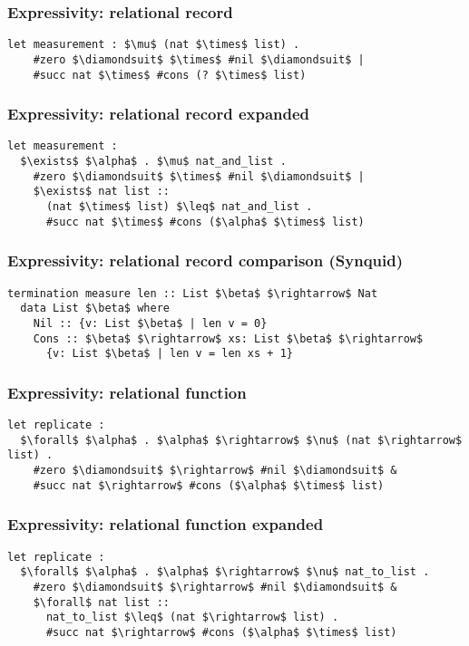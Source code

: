 \documentclass{beamer}
\begin{document}
\begin{frame}[fragile]
  \frametitle{Expressivity: relational record}

  \begin{lstlisting}[]
  let measurement : $\mu$ (nat $\times$ list) .
    #zero $\diamondsuit$ $\times$ #nil $\diamondsuit$ | 
    #succ nat $\times$ #cons (? $\times$ list)
  \end{lstlisting} 

\end{frame}

\begin{frame}[fragile]
  \frametitle{Expressivity: relational record expanded}

  \begin{lstlisting}[]
  let measurement : 
  $\exists$ $\alpha$ . $\mu$ nat_and_list .
    #zero $\diamondsuit$ $\times$ #nil $\diamondsuit$ | 
    $\exists$ nat list :: 
      (nat $\times$ list) $\leq$ nat_and_list .
      #succ nat $\times$ #cons ($\alpha$ $\times$ list)
  \end{lstlisting}

\end{frame}

\begin{frame}[fragile]
  \frametitle{Expressivity: relational record comparison (Synquid)}

  \begin{lstlisting}[keywords={termination, measure, data, where}]
  termination measure len :: List $\beta$ $\rightarrow$ Nat 
  data List $\beta$ where
    Nil :: {v: List $\beta$ | len v = 0}
    Cons :: $\beta$ $\rightarrow$ xs: List $\beta$ $\rightarrow$ 
      {v: List $\beta$ | len v = len xs + 1}

  \end{lstlisting}
\end{frame}

\begin{frame}[fragile]
  \frametitle{Expressivity: relational function}

  \begin{lstlisting}[]
  let replicate : 
  $\forall$ $\alpha$ . $\alpha$ $\rightarrow$ $\nu$ (nat $\rightarrow$ list) .
    #zero $\diamondsuit$ $\rightarrow$ #nil $\diamondsuit$ & 
    #succ nat $\rightarrow$ #cons ($\alpha$ $\times$ list)
  \end{lstlisting}


\end{frame}

\begin{frame}[fragile]

  \frametitle{Expressivity: relational function expanded}

  \begin{lstlisting}[]
  let replicate : 
  $\forall$ $\alpha$ . $\alpha$ $\rightarrow$ $\nu$ nat_to_list .
    #zero $\diamondsuit$ $\rightarrow$ #nil $\diamondsuit$ & 
    $\forall$ nat list :: 
      nat_to_list $\leq$ (nat $\rightarrow$ list) .
      #succ nat $\rightarrow$ #cons ($\alpha$ $\times$ list)
  \end{lstlisting}

\end{frame}
\end{document}
